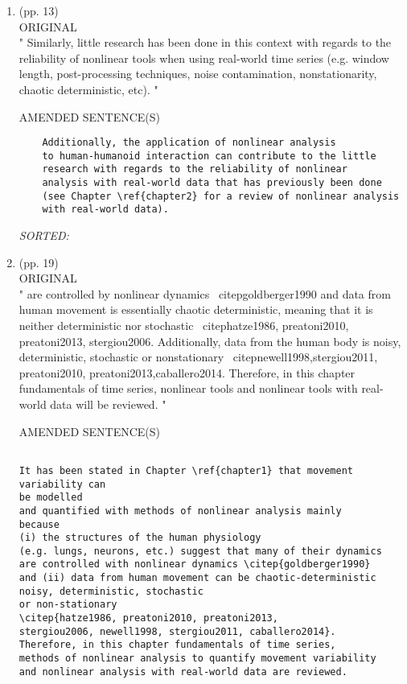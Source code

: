 \documentclass[12pt]{article}
\begin{document}
\begin{enumerate}
\item  (pp. 13)    \\


ORIGINAL \\
	"
	Similarly, little research has been done in this context 
	with regards to the reliability of nonlinear tools 
	when using real-world time series 
	(e.g. window length, post-processing techniques, 
	noise contamination, nonstationarity, chaotic deterministic, etc).
	"

	AMENDED SENTENCE(S) \\
	\begin{verbatim}
	Additionally, the application of nonlinear analysis 
	to human-humanoid interaction can contribute to the little 
	research with regards to the reliability of nonlinear
	analysis with real-world data that has previously been done 
	(see Chapter \ref{chapter2} for a review of nonlinear analysis 
	with real-world data).	
	\end{verbatim}
	\textit{
	SORTED:  
	}
	\\










\item  (pp. 19)  \\ 
ORIGINAL \\
"
are controlled by nonlinear dynamics \ citep{goldberger1990}
and data from human movement is essentially chaotic deterministic, 
meaning that it is neither deterministic nor stochastic 
\ citep{hatze1986, preatoni2010, preatoni2013, stergiou2006}. 
Additionally, data from the human body is noisy, deterministic, stochastic 
or nonstationary 
\ citep{newell1998,stergiou2011, preatoni2010, preatoni2013,caballero2014}.
Therefore, in this chapter fundamentals of time series, nonlinear tools and
nonlinear tools with real-world data will be reviewed.
"

AMENDED SENTENCE(S) \\
	\begin{verbatim}

It has been stated in Chapter \ref{chapter1} that movement variability can 
be modelled
and quantified with methods of nonlinear analysis mainly 
because
(i) the structures of the human physiology 
(e.g. lungs, neurons, etc.) suggest that many of their dynamics 
are controlled with nonlinear dynamics \citep{goldberger1990} 
and (ii) data from human movement can be chaotic-deterministic
noisy, deterministic, stochastic 
or non-stationary 
\citep{hatze1986, preatoni2010, preatoni2013, 
stergiou2006, newell1998, stergiou2011, caballero2014}.
Therefore, in this chapter fundamentals of time series, 
methods of nonlinear analysis to quantify movement variability 
and nonlinear analysis with real-world data are reviewed.
	

\end{verbatim}
\end{enumerate}
\end{document}
